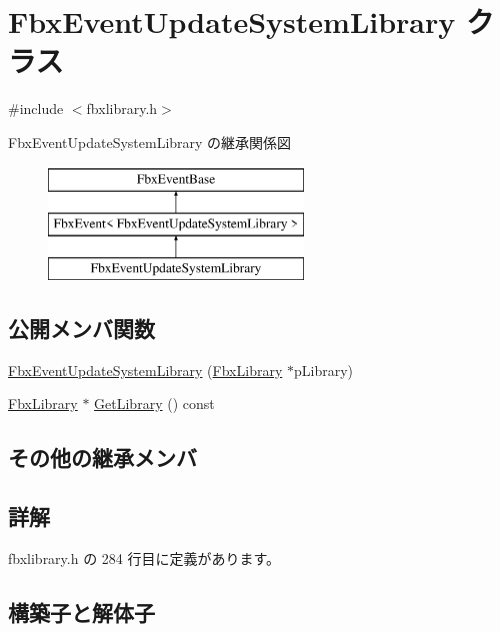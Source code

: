 \hypertarget{class_fbx_event_update_system_library}{}\section{Fbx\+Event\+Update\+System\+Library クラス}
\label{class_fbx_event_update_system_library}


{\ttfamily \#include $<$fbxlibrary.\+h$>$}

Fbx\+Event\+Update\+System\+Library の継承関係図\begin{figure}[H]
\begin{center}
\leavevmode
\includegraphics[height=3.000000cm]{class_fbx_event_update_system_library}
\end{center}
\end{figure}
\subsection*{公開メンバ関数}
\begin{DoxyCompactItemize}
\item 
\hyperlink{class_fbx_event_update_system_library_a1b45029571ddf6bf090d9c4c04f3b8bd}{Fbx\+Event\+Update\+System\+Library} (\hyperlink{class_fbx_library}{Fbx\+Library} $\ast$p\+Library)
\item 
\hyperlink{class_fbx_library}{Fbx\+Library} $\ast$ \hyperlink{class_fbx_event_update_system_library_a216f7eb4fed21eeac1aa0398fb164288}{Get\+Library} () const
\end{DoxyCompactItemize}
\subsection*{その他の継承メンバ}


\subsection{詳解}


 fbxlibrary.\+h の 284 行目に定義があります。



\subsection{構築子と解体子}
\mbox{\label{class_fbx_event_update_system_library_a1b45029571ddf6bf090d9c4c04f3b8bd}} 
